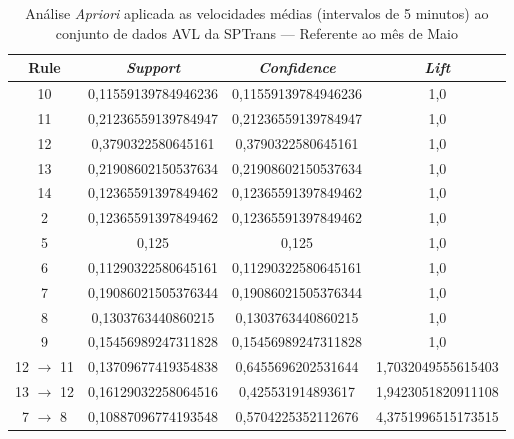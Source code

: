 \documentclass[
	12pt,				%
	oneside,			%
	a4paper,			%
	english,			%
	brazil				%
	]{abntex2ppgsi}
\begin{document}
{{\begin{apendicesenv}
\begin{table}[!htb]
\centering
\caption {Análise \textit{Apriori} aplicada as velocidades médias (intervalos de 5 minutos) ao conjunto de dados AVL da SPTrans --- Referente ao mês de Maio}
\label {tab:aprioriMay}
\begin{tabular}{c|c|c|c}
\hline
\textbf{Rule} & \textit{\textbf{Support}} & \textit{\textbf{Confidence}} & \textit{\textbf{Lift}} \\
\hline
10 &  0,11559139784946236 &  0,11559139784946236 &  1,0\\
\hline
11 &  0,21236559139784947 &  0,21236559139784947 &  1,0\\
\hline
12 &  0,3790322580645161 &  0,3790322580645161 &  1,0\\
\hline
13 &  0,21908602150537634 &  0,21908602150537634 &  1,0\\
\hline
14 &  0,12365591397849462 &  0,12365591397849462 &  1,0\\
\hline
2 &  0,12365591397849462 &  0,12365591397849462 &  1,0\\
\hline
5 &  0,125 &  0,125 &  1,0\\
\hline
6 &  0,11290322580645161 &  0,11290322580645161 &  1,0\\
\hline
7 &  0,19086021505376344 &  0,19086021505376344 &  1,0\\
\hline
8 &  0,1303763440860215 &  0,1303763440860215 &  1,0\\
\hline
9 &  0,15456989247311828 &  0,15456989247311828 &  1,0\\
\hline
12 $\rightarrow$ 11 &  0,13709677419354838 &  0,6455696202531644 &  1,7032049555615403\\
\hline
13 $\rightarrow$ 12 &  0,16129032258064516 &  0,425531914893617 &  1,9423051820911108\\
\hline
7 $\rightarrow$ 8 &  0,10887096774193548 &  0,5704225352112676 &  4,3751996515173515\\
\hline
\end{tabular}
\end{table}


\end{apendicesenv}}}
\end{document}

